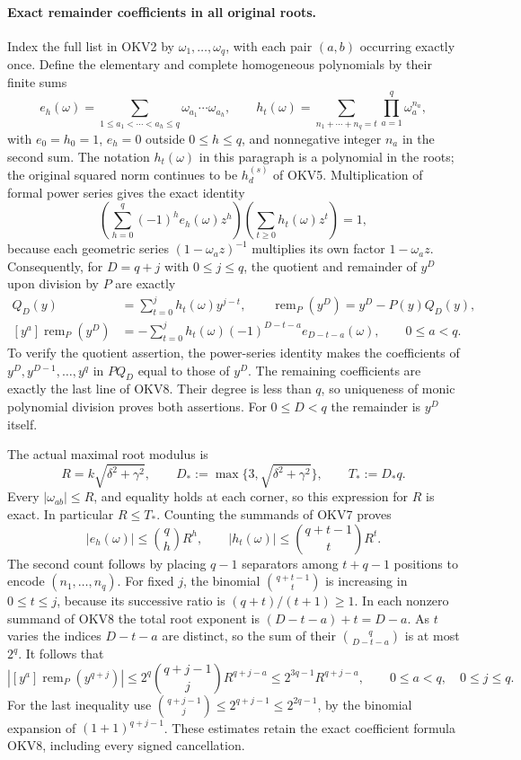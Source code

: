 \documentclass[11pt,a4paper]{article}
\begin{document}
\paragraph{Exact remainder coefficients in all original roots.}
Index the full list in OKV2 by $\omega_1,\ldots,\omega_q$, with
each pair $(a,b)$ occurring exactly once. Define the elementary and
complete homogeneous polynomials by their finite sums
\[
 e_h(\omega)=\sum_{1\le a_1<\cdots<a_h\le q}
                      \omega_{a_1}\cdots\omega_{a_h},\qquad
 h_t(\omega)=\sum_{n_1+\cdots+n_q=t}\prod_{a=1}^q\omega_a^{n_a},
 \tag{OKV7}
\]
with $e_0=h_0=1$, $e_h=0$ outside $0\le h\le q$, and
nonnegative integer $n_a$ in the second sum. The notation $h_t(\omega)$
in this paragraph is a polynomial in the roots; the original squared
norm continues to be $h_d^{(s)}$ of OKV5. Multiplication of formal
power series gives the exact identity
\[
 \left(\sum_{h=0}^q(-1)^he_h(\omega)z^h\right)
 \left(\sum_{t\ge0}h_t(\omega)z^t\right)=1,
\]
because each geometric series $(1-\omega_a z)^{-1}$ multiplies its
own factor $1-\omega_a z$. Consequently, for $D=q+j$ with $0\le j\le q$,
the quotient and remainder of $y^D$ upon division by $P$ are exactly
\[
\begin{split}
 Q_D(y)&=\sum_{t=0}^jh_t(\omega)y^{j-t},\qquad
 \operatorname{rem}_P(y^D)=y^D-P(y)Q_D(y),\\
 [y^a]\operatorname{rem}_P(y^D)
   &=-\sum_{t=0}^j h_t(\omega)(-1)^{D-t-a}e_{D-t-a}(\omega),
       \qquad 0\le a<q.
\end{split}
 \tag{OKV8}
\]
To verify the quotient assertion, the power-series identity makes
the coefficients of $y^D,y^{D-1},\ldots,y^q$ in $P Q_D$ equal
to those of $y^D$. The remaining coefficients are exactly the last
line of OKV8. Their degree is less than $q$, so uniqueness of monic
polynomial division proves both assertions. For $0\le D<q$ the
remainder is $y^D$ itself.

The actual maximal root modulus is
\[
 R=k\sqrt{\delta^2+\gamma^2},\qquad
 D_*:=\max\{3,\sqrt{\delta^2+\gamma^2}\},\qquad T_*:=D_*q.
 \tag{OKV9}
\]
Every $|\omega_{ab}|\le R$, and equality holds at each corner,
so this expression for $R$ is exact. In particular $R\le T_*$.
Counting the summands of OKV7 proves
\[
 |e_h(\omega)|\le\binom qh R^h,\qquad
 |h_t(\omega)|\le\binom{q+t-1}{t}R^t.
\]
The second count follows by placing $q-1$ separators among $t+q-1$
positions to encode $(n_1,\ldots,n_q)$. For fixed $j$, the binomial
$\binom{q+t-1}{t}$ is increasing in $0\le t\le j$, because its
successive ratio is $(q+t)/(t+1)\ge1$. In each nonzero summand
of OKV8 the total root exponent is $(D-t-a)+t=D-a$.
As $t$ varies the indices $D-t-a$ are distinct, so the sum of
their $\binom q{D-t-a}$ is at most $2^q$. It follows that
\[
 \left|[y^a]\operatorname{rem}_P(y^{q+j})\right|
 \le2^q\binom{q+j-1}{j}R^{q+j-a}
 \le2^{3q-1}R^{q+j-a},\qquad 0\le a<q,\quad0\le j\le q.
 \tag{OKV10}
\]
For the last inequality use
$\binom{q+j-1}{j}\le2^{q+j-1}\le2^{2q-1}$, by the binomial
expansion of $(1+1)^{q+j-1}$. These estimates retain the exact
coefficient formula OKV8, including every signed cancellation.
\end{document}
